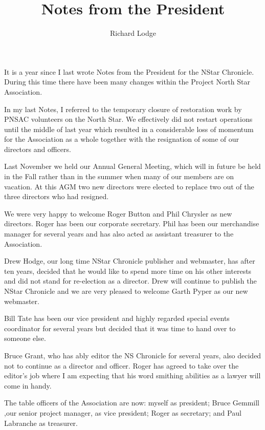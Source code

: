 
%


\title{Notes from the President}
\author{Richard Lodge}

\maketitle

It is a year since I last wrote Notes from the President for the NStar Chronicle. During this time there have been many changes within the Project North Star Association. 

In my last Notes, I referred to the temporary closure of restoration work by PNSAC volunteers on 
the North Star. We effectively did not restart operations until the middle of last year which 
resulted in a considerable loss of momentum for the Association as a whole together with the 
resignation of some of our directors and officers.

Last November we held our Annual General Meeting, which will in future be held in the Fall rather 
than in the summer when many of our members are on vacation. At this AGM two new directors were 
elected to replace two out of the three directors who had resigned.

We were very happy to welcome Roger Button and Phil Chrysler as new directors. Roger has been our corporate secretary. Phil has been our merchandise manager for several years and has also acted as assistant treasurer to the Association. 

Drew Hodge, our long time NStar Chronicle publisher and webmaster, has after ten years, decided 
that he would like to spend more time on his other interests and did not stand for re-election as a director. Drew will continue to publish the NStar Chronicle and we are very pleased to 
welcome Garth Pyper as our new webmaster. 

Bill Tate has been our vice president and  highly regarded special events coordinator for several years but decided that it was time to hand over to someone else. 

Bruce Grant, who has ably editor the NS Chronicle for several years, also decided not to continue as a director and officer. Roger has agreed to take over the editor's  job where I am expecting that his word smithing abilities as a lawyer will come in handy.

The table officers of the Association  are now:  myself as president; Bruce Gemmill ,our senior project manager, as vice president; Roger  as secretary; and Paul Labranche as treasurer. 

